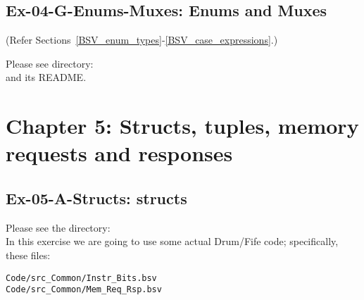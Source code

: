 
\subsection*{Ex-04-G-Enums-Muxes: Enums and Muxes}
\label{Ex-04-G-Enums-Muxes}

(Refer Sections~\ref{BSV_enum_types}-\ref{BSV_case_expressions}.)

Please see directory:  \\
and its README.


\hdivider

\section*{Chapter 5: Structs, tuples, memory requests and responses}


\subsection*{Ex-05-A-Structs: structs}
\label{Ex-05-A-Structs}

Please see the directory:  \\
In this exercise we are going to use some actual Drum/Fife code;
specifically, these files:

\begin{tabbing}
\hmmmm \= \verb|Code/src_Common/Instr_Bits.bsv| \\
       \> \verb|Code/src_Common/Mem_Req_Rsp.bsv|
\end{tabbing}

